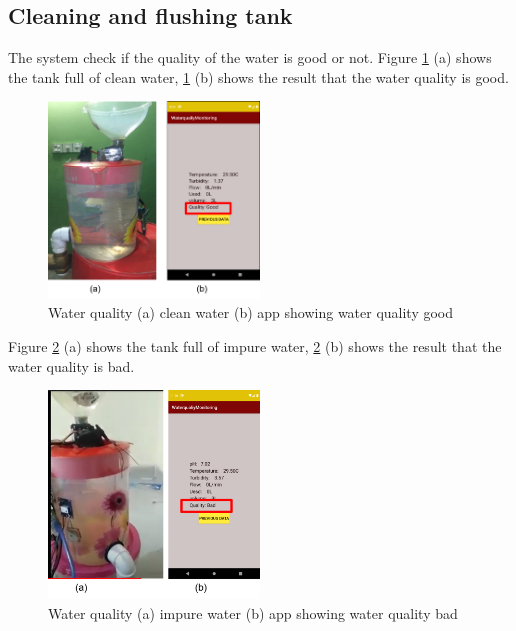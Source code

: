 \subsection{Cleaning and flushing tank}
The system check if the quality of the water is good or not. Figure \ref{cleanWater} (a) shows the tank full of clean water, \ref{cleanWater} (b) shows the result that the water quality is good.
\begin{figure}[h]
\centering
\includegraphics[width=0.5\textwidth]{figures/clearWater.png}
\caption{Water quality (a) clean water (b) app showing water quality good}
\label{cleanWater}
\end{figure}

Figure \ref{badWater} (a) shows the tank full of impure water, \ref{badWater} (b) shows the result that the water quality is bad.
\begin{figure}[h]
\centering
\includegraphics[width=0.5\textwidth]{figures/badWater.png}
\caption{Water quality (a) impure water (b) app showing water quality bad}
\label{badWater}
\end{figure}

